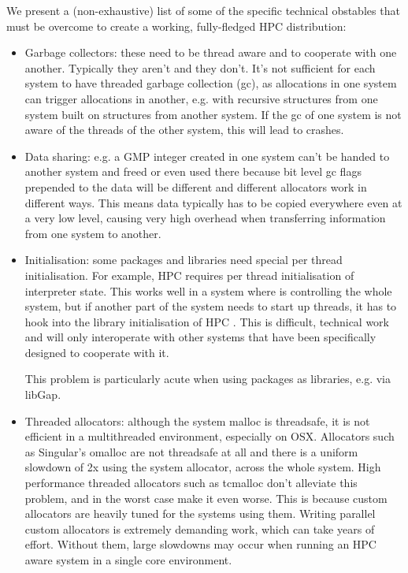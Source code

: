 \documentclass{deliverablereport}
\begin{document}
We present a (non-exhaustive) list of some of the specific technical obstables that must be
overcome to create a working, fully-fledged HPC distribution:

\begin{itemize}
\item Garbage collectors: these need to be thread aware and to cooperate with one another.
  Typically they aren't and they don't. It's not sufficient for each system to have threaded
  garbage collection (gc), as allocations in one system can trigger allocations in another, e.g.
  with recursive structures from one system built on structures from another system. If the
  gc of one system is not aware of the threads of the other system, this will lead to crashes.

\item Data sharing: e.g. a GMP integer created in one system can't be handed to another system
  and freed or even used there because bit level gc flags prepended to the data will be different
  and different allocators work in different ways. This means data typically has to be copied
  everywhere even at a very low level, causing very high overhead when transferring information
  from one system to another.

\item Initialisation: some packages and libraries need special per thread initialisation. For
  example, HPC \GAP requires per thread initialisation of interpreter state. This works well in a
  system where \GAP is controlling the whole system, but if another part of the system needs to
  start up threads, it has to hook into the library initialisation of HPC \GAP. This is difficult,
  technical work and will only interoperate with other systems that have been specifically
  designed to cooperate with it.

  This problem is particularly acute when using packages as libraries, e.g. via libGap.

\item Threaded allocators: although the system malloc is threadsafe, it is not efficient in a
  multithreaded environment, especially on OSX. Allocators such as Singular's omalloc are not
  threadsafe at all and there is a uniform slowdown of 2x using the system allocator, across
  the whole system. High performance threaded allocators such as tcmalloc don't alleviate this
  problem, and in the worst case make it even worse. This is because custom allocators are
  heavily tuned for the systems using them. Writing parallel custom allocators is extremely
  demanding work, which can take years of effort. Without them, large slowdowns may occur when
  running an HPC aware system in a single core environment.


\end{itemize}
\end{document}
